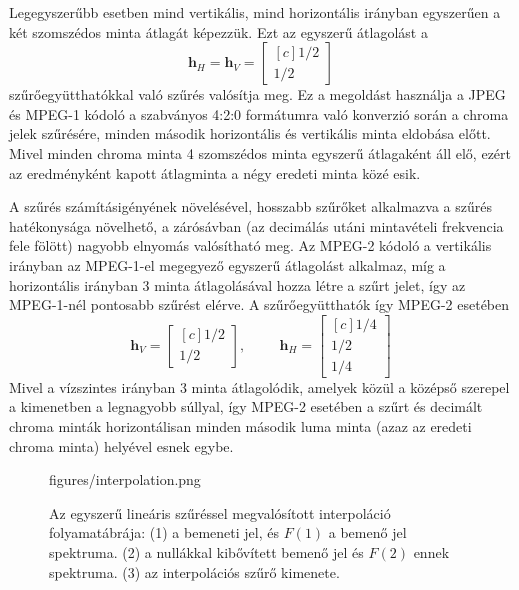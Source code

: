 Legegyszerűbb esetben mind vertikális, mind horizontális irányban egyszerűen a két szomszédos minta átlagát képezzük.
Ezt az egyszerű átlagolást a 
\begin{equation}
\mathbf{h}_H =
\mathbf{h}_V =
\begin{bmatrix}[c]
       1/2 \\[0.3em]
       1/2\end{bmatrix}
\end{equation}
szűrőegyütthatókkal való szűrés valósítja meg.
Ez a megoldást használja a JPEG és MPEG-1 kódoló a szabványos 4:2:0 formátumra való konverzió során a chroma jelek szűrésére, minden második horizontális és vertikális minta eldobása előtt.
Mivel minden chroma minta 4 szomszédos minta egyszerű átlagaként áll elő, ezért az eredményként kapott átlagminta a négy eredeti minta közé esik.

A szűrés számításigényének növelésével, hosszabb szűrőket alkalmazva a szűrés hatékonysága növelhető, a zárósávban (az decimálás utáni mintavételi frekvencia fele fölött) nagyobb elnyomás valósítható meg.
Az MPEG-2 kódoló a vertikális irányban az MPEG-1-el megegyező egyszerű átlagolást alkalmaz, míg a horizontális irányban 3 minta átlagolásával hozza létre a szűrt jelet, így az MPEG-1-nél pontosabb szűrést elérve.
A szűrőegyütthatók így MPEG-2 esetében
\begin{equation}
\mathbf{h}_V =
\begin{bmatrix}[c]
       1/2 \\[0.3em]
       1/2\end{bmatrix}
,
\hspace{1cm}
\mathbf{h}_H =
\begin{bmatrix}[c]
       1/4 \\[0.3em]
       1/2 \\[0.3em]
       1/4\end{bmatrix}
\end{equation}
Mivel a vízszintes irányban 3 minta átlagolódik, amelyek közül a középső szerepel a kimenetben a legnagyobb súllyal, így MPEG-2 esetében a szűrt és decimált chroma minták horizontálisan minden második luma minta (azaz az eredeti chroma minta) helyével esnek egybe.
\begin{figure}[]
	\centering
	\begin{overpic}[width = 0.8\columnwidth]{figures/interpolation.png}
 	\end{overpic}
	\caption{Az egyszerű lineáris szűréssel megvalósított interpoláció folyamatábrája:
	(1) a bemeneti jel, és $F(1)$ a bemenő jel spektruma.
	(2) a nullákkal kibővített bemenő jel és $F(2)$ ennek spektruma.
	(3) az interpolációs szűrő kimenete.}
	\label{Fig:interpolation}
\end{figure}

